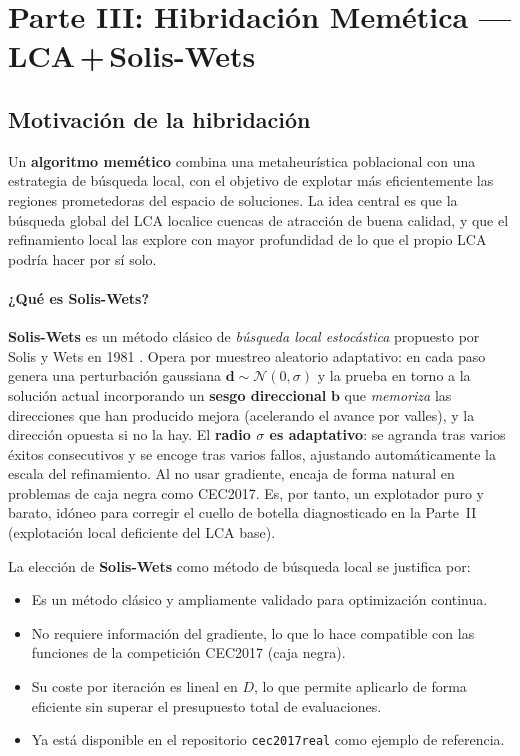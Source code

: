 
\newpage
\section{Parte III: Hibridación Memética — LCA\,+\,Solis-Wets}
\label{sec:parte3}

\subsection{Motivación de la hibridación}

Un \textbf{algoritmo memético} combina una metaheurística poblacional con una
estrategia de búsqueda local, con el objetivo de explotar más eficientemente las
regiones prometedoras del espacio de soluciones. La idea central es que la búsqueda
global del LCA localice cuencas de atracción de buena calidad, y que el refinamiento
local las explore con mayor profundidad de lo que el propio LCA podría hacer por sí solo.

\paragraph{¿Qué es Solis-Wets?}
\textbf{Solis-Wets} es un método clásico de \emph{búsqueda local estocástica} propuesto
por Solis y Wets en 1981 \cite{solis1981minimization}. Opera por muestreo aleatorio
adaptativo: en cada paso genera una perturbación gaussiana $\mathbf{d}\sim\mathcal{N}(0,\sigma)$
y la prueba en torno a la solución actual incorporando un \textbf{sesgo direccional}
$\mathbf{b}$ que \emph{memoriza} las direcciones que han producido mejora (acelerando el
avance por valles), y la dirección opuesta si no la hay. El \textbf{radio $\sigma$ es
adaptativo}: se agranda tras varios éxitos consecutivos y se encoge tras varios fallos,
ajustando automáticamente la escala del refinamiento. Al no usar gradiente, encaja de
forma natural en problemas de caja negra como CEC2017. Es, por tanto, un explotador puro
y barato, idóneo para corregir el cuello de botella diagnosticado en la Parte~II
(explotación local deficiente del LCA base).

La elección de \textbf{Solis-Wets} como método de búsqueda local se justifica por:
\begin{itemize}
  \item Es un método clásico y ampliamente validado para optimización continua.
  \item No requiere información del gradiente, lo que lo hace compatible con las
        funciones de la competición CEC2017 (caja negra).
  \item Su coste por iteración es lineal en $D$, lo que permite aplicarlo de forma
        eficiente sin superar el presupuesto total de evaluaciones.
  \item Ya está disponible en el repositorio \texttt{cec2017real} como ejemplo de referencia.
\end{itemize}

